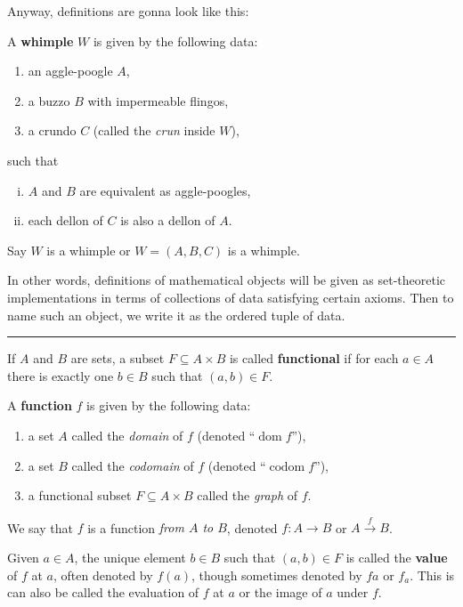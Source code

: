 \documentclass[12pt]{article}
\newlength{\myparskip}
\newenvironment{fullbox}{\begin{lrbox}{\savefullbox}\begin{minipage}{\dimexpr\textwidth-2\fboxsep\relax}\setlength{\parskip}{\myparskip}}{\end{minipage}\end{lrbox}\framebox[\textwidth]{\usebox{\savefullbox}}}
\newcommand{\keyword}[1]{\textbf{#1}}
\newcommand{\sepline}{\rule{\textwidth}{0.4pt}}
\theoremstyle{definition}
\newcommand{\<}{\left\langle}
\renewcommand{\>}{\right\rangle}
\newcommand{\seq}{\subseteq}
\DeclareMathOperator{\dom}{dom}
\DeclareMathOperator{\codom}{codom}
\renewcommand{\_}[1]{{_{#1}}}
\begin{document}
Anyway, definitions are gonna look like this:

\begin{fullbox}
    A \keyword{whimple} $W$ is given by the following data:
    \begin{enumerate}[(1)]
        \item an aggle-poogle $A$,
        \item a buzzo $B$ with impermeable flingos,
        \item a crundo $C$ (called the \emph{crun} inside $W$),
    \end{enumerate}
    such that
    \begin{enumerate}[(i)]
        \item $A$ and $B$ are equivalent as aggle-poogles,
        \item each dellon of $C$ is also a dellon of $A$.
    \end{enumerate}
    Say $W$ is a whimple or $W = (A, B, C)$ is a whimple.
\end{fullbox}

In other words, definitions of mathematical objects will be given as set-theoretic implementations in terms of collections of data satisfying certain axioms.
Then to name such an object, we write it as the ordered tuple of data.

\sepline

If $A$ and $B$ are sets, a subset $F \seq A \times B$ is called \keyword{functional} if for each $a \in A$ there is exactly one $b \in B$ such that $(a, b) \in F$.

A \keyword{function} $f$ is given by the following data:
\begin{enumerate}[(1)]
    \item a set $A$ called the \emph{domain} of $f$ (denoted ``$\dom f$''),
    \item a set $B$ called the \emph{codomain} of $f$ (denoted ``$\codom f$''),
    \item a functional subset $F \seq A \times B$ called the \emph{graph} of $f$.
\end{enumerate}
We say that $f$ is a function \emph{from $A$ to $B$}, denoted $f : A \to B$ or $A \xrightarrow{f} B$.

Given $a \in A$, the unique element $b \in B$ such that $(a, b) \in F$ is called the \keyword{value} of $f$ at $a$, often denoted by $f(a)$, though sometimes denoted by $fa$ or $f_a$.
This is can also be called the evaluation of $f$ at $a$ or the image of $a$ under $f$.
\end{document}
